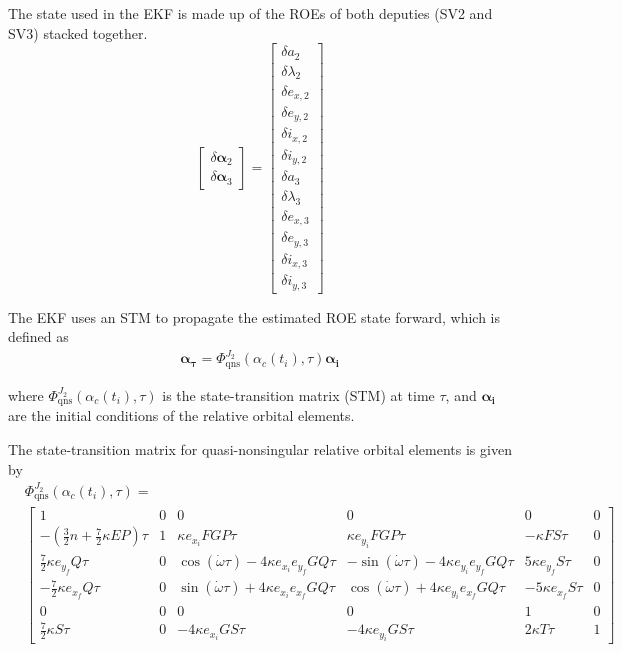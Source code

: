 The state used in the EKF is made up of the ROEs of both deputies (SV2 and SV3) stacked together.
\begin{equation}
\begin{bmatrix}
\delta \boldsymbol{\alpha}_2 \\
\hline
\delta \boldsymbol{\alpha}_3
\end{bmatrix}
=
\begin{bmatrix}
\delta a_2 \\
\delta \lambda_2 \\
\delta e_{x,2} \\
\delta e_{y,2} \\
\delta i_{x,2} \\
\delta i_{y,2} \\
\hline
\delta a_3 \\
\delta \lambda_3 \\
\delta e_{x,3} \\
\delta e_{y,3} \\
\delta i_{x,3} \\
\delta i_{y,3}
\end{bmatrix}
\end{equation}

The EKF uses an STM to propagate the estimated ROE state forward, which is defined as
\begin{align}
    \boldsymbol{\alpha_{\tau}} = \Phi^{J_2}_{\text{qns}}(\alpha_c(t_i), \tau) \boldsymbol{\alpha_{i}} \label{eq:state_transition_relation}
\end{align}

where $\Phi^{J_2}_{\text{qns}}(\alpha_c(t_i), \tau)$ is the state-transition matrix (STM) at time $\tau$, and $\boldsymbol{\alpha_{i}}$ are the initial conditions of the relative orbital elements.

The state-transition matrix for quasi-nonsingular relative orbital elements is given by
\begin{align}
&\Phi^{J_2}_{\text{qns}}(\alpha_c(t_i), \tau) = \nonumber \\ 
&\begin{bmatrix}
1 & 0 & 0 & 0 & 0 & 0 \\
-\left( \frac{3}{2}n + \frac{7}{2} \kappa E P \right)\tau & 1 & \kappa e_{x_i} F G P \tau & \kappa e_{y_i} F G P \tau & -\kappa F S \tau & 0 \\
\frac{7}{2} \kappa e_{y_f} Q \tau & 0 & \cos(\dot{\omega} \tau) - 4\kappa e_{x_i} e_{y_f} G Q \tau & -\sin(\dot{\omega} \tau) - 4\kappa e_{y_i} e_{y_f} G Q \tau & 5\kappa e_{y_f} S \tau & 0 \\
-\frac{7}{2} \kappa e_{x_f} Q \tau & 0 & \sin(\dot{\omega} \tau) + 4\kappa e_{x_i} e_{x_f} G Q \tau & \cos(\dot{\omega} \tau) + 4\kappa e_{y_i} e_{x_f} G Q \tau & -5\kappa e_{x_f} S \tau & 0 \\
0 & 0 & 0 & 0 & 1 & 0 \\
\frac{7}{2} \kappa S \tau & 0 & -4 \kappa e_{x_i} G S \tau & -4 \kappa e_{y_i} G S \tau & 2 \kappa T \tau & 1
\end{bmatrix} \label{eq:stm_matrix}
\end{align}

